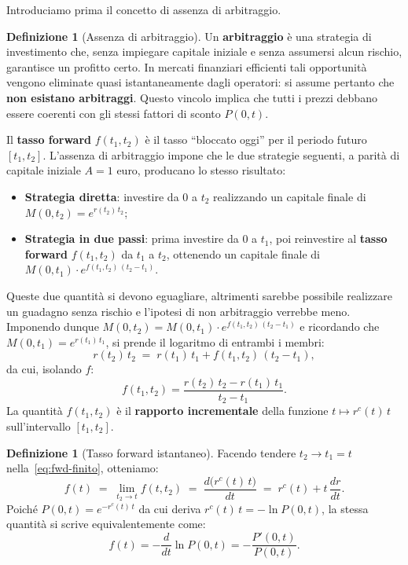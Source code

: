 \documentclass[11pt,a4paper]{article}
\theoremstyle{plain}
\theoremstyle{definition}
\newtheorem{definizione}[teorema]{Definizione}
\theoremstyle{remark}
\begin{document}
Introduciamo prima il concetto di assenza di arbitraggio.
\begin{definizione}[Assenza di arbitraggio]
\label{def:noarb}
Un \textbf{arbitraggio} \`e una strategia di investimento che, senza impiegare capitale
iniziale e senza assumersi alcun rischio, garantisce un profitto certo. In mercati
finanziari efficienti tali opportunit\`a vengono eliminate quasi istantaneamente dagli
operatori: si assume pertanto che \textbf{non esistano arbitraggi}. Questo vincolo implica
che tutti i prezzi debbano essere coerenti con gli stessi fattori di sconto $P(0,t)$.
\end{definizione}

Il \textbf{tasso forward} $f(t_1, t_2)$ \`e il tasso ``bloccato oggi'' per il periodo
futuro $[t_1, t_2]$. L'assenza di arbitraggio impone che le due strategie seguenti, a parit\`a
di capitale iniziale $A=1$ euro, producano lo stesso risultato:
\begin{itemize}
  \item \textbf{Strategia diretta}: investire da $0$ a $t_2$ realizzando un capitale finale di $M(0,t_2) = e^{r(t_2)\,t_2}$;
  \item \textbf{Strategia in due passi}: prima investire da $0$ a $t_1$, poi reinvestire al
        \textbf{tasso forward} $f(t_1,t_2)$ da $t_1$ a $t_2$, ottenendo un capitale finale di
        $M(0,t_1)\cdot e^{f(t_1,t_2)\,(t_2-t_1)}$.
\end{itemize}

Queste due quantit\`a si devono eguagliare, altrimenti sarebbe possibile realizzare un guadagno
senza rischio e l'ipotesi di non arbitraggio verrebbe meno. Imponendo dunque
$M(0,t_2) = M(0,t_1)\cdot e^{f(t_1,t_2)\,(t_2-t_1)}$ e ricordando che $M(0,t_1)=e^{r(t_1)\,t_1}$, si prende il logaritmo di entrambi i membri:
\[
  r(t_2)\,t_2 \;=\; r(t_1)\,t_1 + f(t_1,t_2)\,(t_2-t_1),
\]
da cui, isolando $f$:
\begin{equation}
  f(t_1, t_2) = \frac{r(t_2)\,t_2 - r(t_1)\,t_1}{t_2 - t_1}.
  \label{eq:fwd-finito}
\end{equation}
La quantità $f(t_1,t_2)$ \`e il \textbf{rapporto incrementale} della funzione
$t\mapsto r^c(t)\,t$ sull'intervallo $[t_1,t_2]$.

\begin{definizione}[Tasso forward istantaneo]
\label{def:forward}
Facendo tendere $t_2 \to t_1 = t$ nella~\eqref{eq:fwd-finito}, otteniamo:
\begin{equation}
  f(t) \;=\; \lim_{t_2 \to t} f(t, t_2)
       \;=\; \frac{d\bigl(r^c(t)\,t\bigr)}{dt}
       \;=\; r^c(t) + t\,\frac{dr}{dt}.
  \label{eq:fwd-ist}
\end{equation}
Poich\'e $P(0,t)=e^{-r^c(t)\,t}$ da cui deriva $r^c(t)\,t=-\ln P(0,t)$, la stessa quantit\`a si
scrive equivalentemente come:
\[
  f(t) = -\frac{d}{dt}\ln P(0,t) = -\frac{P'(0,t)}{P(0,t)}.
\]
\end{definizione}
\end{document}
